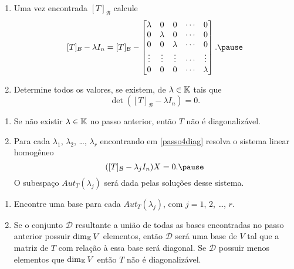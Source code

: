 \documentclass{beamer}
\begin{document}
    \begin{frame}
        \begin{enumerate}[label={\arabic*})]
            \conti
            \item Uma vez encontrada $[T]_\mathcal{B}$ calcule\pause
            \[
                [T]_\mathcal{B} - \lambda I_n = [T]_\mathcal{B} - \begin{bmatrix}\lambda & 0 & 0 & \cdots & 0\\0 & \lambda & 0 & \cdots & 0\\0 & 0 & \lambda & \cdots & 0\\\vdots & \vdots & \vdots & \cdots & \vdots\\0 & 0 & 0 & \cdots & \lambda\end{bmatrix}.\pause
            \]

            \item\label{passo4diag} Determine todos os valores, \pause se existem, de $\lambda \in \mathbb{K}$ \pause tais que\pause
            \[
                \det([T]_\mathcal{B} - \lambda I_n) = 0.
            \]
            \seti
        \end{enumerate}
    \end{frame}

    \begin{frame}
        \begin{enumerate}[label={\arabic*})]
            \conti
            \item Se não existir $\lambda \in \mathbb{K}$ \pause no passo anterior, \pause então $T$ não é diagonalizável.\pause

            \item Para cada $\lambda_1$, \pause $\lambda_2$, \pause \dots, $\lambda_r$ \pause encontrando em \ref{passo4diag} \pause resolva o sistema linear homogêneo\pause
            \[
                ([T]_\mathcal{B} - \lambda_jI_n)X = 0.\pause
            \]
            O subespaço $Aut_T(\lambda_j)$ \pause será dada pelas soluções desse sistema.
            \seti
        \end{enumerate}
    \end{frame}

    \begin{frame}
        \begin{enumerate}[label={\arabic*})]
        \conti
            \item Encontre uma base para cada $Aut_T(\lambda_j)$, \pause com $j = 1$, 2, \dots, $r$.\pause

            \item Se o conjunto $\mathcal{D}$ \pause resultante a união de todas as bases encontradas no passo anterior \pause possuir $\dim_{\mathbb{K}}V$ elementos, \pause então $\mathcal{D}$ será uma base de $V$ \pause tal que a matriz de $T$ com relação à essa base será diagonal. \pause Se $\mathcal{D}$ possuir menos elementos que $\dim_{\mathbb{K}}V$ \pause então $T$ não é diagonalizável.
        \end{enumerate}
    \end{frame}
\end{document}
